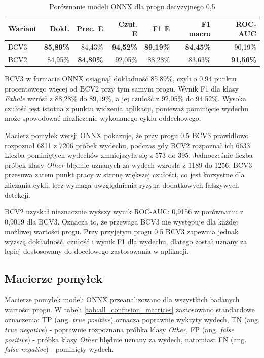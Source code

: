 \begin{table}[htbp]
    \centering
    \caption{Porównanie modeli ONNX dla progu decyzyjnego 0,5}
    \label{tab:model_versions_comparison}
    \scriptsize
    \setlength{\tabcolsep}{4pt}
    \renewcommand{\arraystretch}{1.2}
    \begin{tabular}{@{}lrrrrrr@{}}
        \toprule
        \textbf{Wariant} & \textbf{Dokł.} & \textbf{Prec. E} & \textbf{Czuł. E} & \textbf{F1 E} & \textbf{F1 macro} & \textbf{ROC-AUC} \\
        \midrule
        BCV3 & \textbf{85,89\%} & 84,43\% & \textbf{94,52\%} & \textbf{89,19\%} & \textbf{84,45\%} & 90,19\% \\
        BCV2 & 84,95\% & \textbf{84,80\%} & 92,05\% & 88,28\% & 83,63\% & \textbf{91,56\%} \\
        \bottomrule
    \end{tabular}
\end{table}

BCV3 w formacie ONNX osiągnął dokładność 85,89\%, czyli o 0,94 punktu procentowego więcej od BCV2 przy tym samym progu. Wynik F1 dla klasy \textit{Exhale} wzrósł z 88,28\% do 89,19\%, a jej czułość z 92,05\% do 94,52\%. Wysoka czułość jest istotna z punktu widzenia aplikacji, ponieważ pominięcie wydechu może spowodować niezliczenie wykonanego cyklu oddechowego.

Macierz pomyłek wersji ONNX pokazuje, że przy progu 0,5 BCV3 prawidłowo rozpoznał 6811 z 7206 próbek wydechu, podczas gdy BCV2 rozpoznał ich 6633. Liczba pominiętych wydechów zmniejszyła się z 573 do 395. Jednocześnie liczba próbek klasy \textit{Other} błędnie uznanych za wydech wzrosła z 1189 do 1256. BCV3 przesuwa zatem punkt pracy w stronę większej czułości, co jest korzystne dla zliczania cykli, lecz wymaga uwzględnienia ryzyka dodatkowych fałszywych detekcji.

BCV2 uzyskał nieznacznie wyższy wynik ROC-AUC: 0,9156 w porównaniu z 0,9019 dla BCV3. Oznacza to, że przewaga BCV3 nie występuje dla każdej możliwej wartości progu. Przy przyjętym progu 0,5 BCV3 zapewnia jednak wyższą dokładność, czułość i wynik F1 dla wydechu, dlatego został uznany za lepiej dostosowany do docelowego zastosowania w aplikacji.

\subsection{Macierze pomyłek}

Macierze pomyłek modeli ONNX przeanalizowano dla wszystkich badanych wartości progu. W tabeli \ref{tab:all_confusion_matrices} zastosowano standardowe oznaczenia: TP (ang. \textit{true positive}) oznacza poprawnie wykryty wydech, TN (ang. \textit{true negative}) - poprawnie rozpoznana próbka klasy \textit{Other}, FP (ang. \textit{false positive}) - próbka klasy \textit{Other} błędnie uznany za wydech, natomiast FN (ang. \textit{false negative}) - pominięty wydech.

